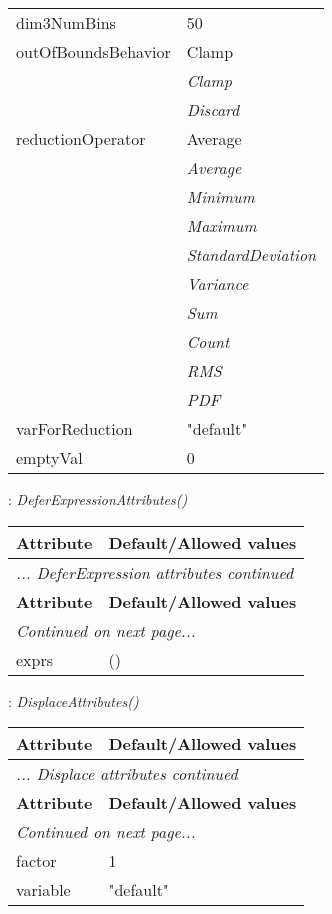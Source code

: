 \documentclass[10pt,a4paper]{report}
\begin{document}
\begin{longtable}{ll}
dim3NumBins  &  50 \\
outOfBoundsBehavior  &  Clamp   \\
 & {\it  Clamp} \\
 & {\it  Discard} \\
reductionOperator  &  Average   \\
 & {\it  Average} \\
 & {\it  Minimum} \\
 & {\it  Maximum} \\
 & {\it  StandardDeviation} \\
 & {\it  Variance} \\
 & {\it  Sum} \\
 & {\it  Count} \\
 & {\it  RMS} \\
 & {\it  PDF} \\
varForReduction  &  "default" \\
emptyVal  &  0 \\
\end{longtable}

\newpage

{}
: {\it DeferExpressionAttributes() }\\[-3mm]

\begin{longtable}{ll}
{\bf Attribute} & {\bf Default/Allowed values} \\
\hline \hline
\endfirsthead
\multicolumn{2}{l}{{\it ... DeferExpression attributes continued}} \\
{\bf Attribute} & {\bf Default/Allowed values} \\
\hline \hline
\endhead
\hline
\multicolumn{2}{l}{{\it Continued on next page...}} \\
\endfoot
\hline
\endlastfoot

exprs  &  () \\
\end{longtable}

\newpage

{}
: {\it DisplaceAttributes() }\\[-3mm]

\begin{longtable}{ll}
{\bf Attribute} & {\bf Default/Allowed values} \\
\hline \hline
\endfirsthead
\multicolumn{2}{l}{{\it ... Displace attributes continued}} \\
{\bf Attribute} & {\bf Default/Allowed values} \\
\hline \hline
\endhead
\hline
\multicolumn{2}{l}{{\it Continued on next page...}} \\
\endfoot
\hline
\endlastfoot

factor  &  1 \\
variable  &  "default" \\
\end{longtable}
\end{document}
